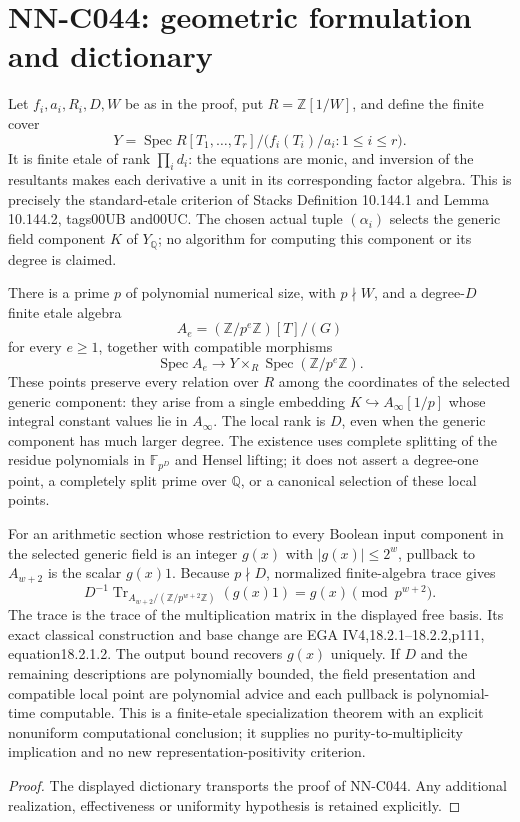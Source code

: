 \section{NN-C044: geometric formulation and dictionary}
\begin{geometricstatement}[NN-C044]
Let $f_i,a_i,R_i,D,W$ be as in the proof, put $R=\mathbb Z[1/W]$, and define the finite cover
\[
 Y=\operatorname{Spec}
       R[T_1,\ldots,T_r]/\bigl(f_i(T_i)/a_i:1\le i\le r\bigr).
\]
It is finite etale of rank $\prod_i d_i$: the equations are monic, and inversion of the resultants makes each derivative a unit in its corresponding factor algebra. This is precisely the standard-etale criterion of Stacks Definition 10.144.1 and Lemma 10.144.2, tags00UB and00UC. The chosen actual tuple $(\alpha_i)$ selects the generic field component $K$ of $Y_{\mathbb Q}$; no algorithm for computing this component or its degree is claimed.

There is a prime $p$ of polynomial numerical size, with $p\nmid W$, and a degree-$D$ finite etale algebra
\[
       A_e=(\mathbb Z/p^e\mathbb Z)[T]/(G)
\]
for every $e\ge1$, together with compatible morphisms
\[
       \operatorname{Spec}A_e\longrightarrow
           Y\times_R\operatorname{Spec}(\mathbb Z/p^e\mathbb Z).
\]
These points preserve every relation over $R$ among the coordinates of the selected generic component: they arise from a single embedding $K\hookrightarrow A_\infty[1/p]$ whose integral constant values lie in $A_\infty$. The local rank is $D$, even when the generic component has much larger degree. The existence uses complete splitting of the residue polynomials in $\mathbb F_{p^D}$ and Hensel lifting; it does not assert a degree-one point, a completely split prime over $\mathbb Q$, or a canonical selection of these local points.

For an arithmetic section whose restriction to every Boolean input component in the selected generic field is an integer $g(x)$ with $|g(x)|\le2^w$, pullback to $A_{w+2}$ is the scalar $g(x)1$. Because $p\nmid D$, normalized finite-algebra trace gives
\[
 D^{-1}\operatorname{Tr}_{A_{w+2}/(\mathbb Z/p^{w+2}\mathbb Z)}(g(x)1)
                  =g(x)\pmod{p^{w+2}}.
\]
The trace is the trace of the multiplication matrix in the displayed free basis. Its exact classical construction and base change are EGA IV4,18.2.1--18.2.2,p111, equation18.2.1.2. The output bound recovers $g(x)$ uniquely. If $D$ and the remaining descriptions are polynomially bounded, the field presentation and compatible local point are polynomial advice and each pullback is polynomial-time computable. This is a finite-etale specialization theorem with an explicit nonuniform computational conclusion; it supplies no purity-to-multiplicity implication and no new representation-positivity criterion.
\end{geometricstatement}
\begin{proof} The displayed dictionary transports the proof of NN-C044. Any additional realization, effectiveness or uniformity hypothesis is retained explicitly.\end{proof}


